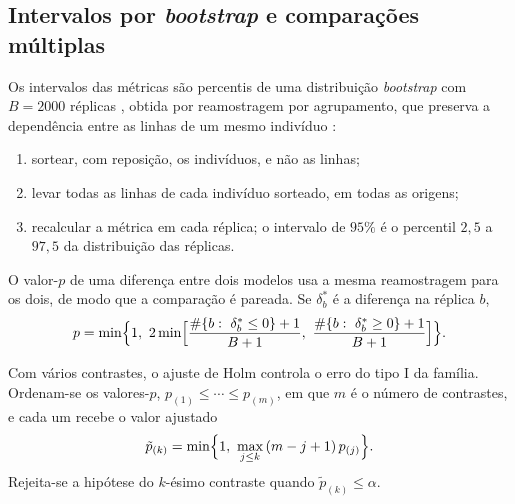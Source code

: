     \subsection{Intervalos por \textit{bootstrap} e comparações múltiplas}
    \label{subsec:incerteza_metricas}

Os intervalos das métricas são percentis de uma distribuição \textit{bootstrap} com $B = 2000$ réplicas \citep{davison1997}, obtida por reamostragem por agrupamento, que preserva a dependência entre as linhas de um mesmo indivíduo \citep{field2007,davison1997,harrell2001}:
\begin{enumerate}
    \item sortear, com reposição, os indivíduos, e não as linhas;
    \item levar todas as linhas de cada indivíduo sorteado, em todas as origens;
    \item recalcular a métrica em cada réplica; o intervalo de $95\%$ é o percentil $2{,}5$ a $97{,}5$ da distribuição das réplicas.
\end{enumerate}
O valor-$p$ de uma diferença entre dois modelos usa a mesma reamostragem para os dois, de modo que a comparação é pareada. Se $\delta_b^{*}$ é a diferença na réplica $b$,
\begin{equation}
    p = \min\Bigl\{1,\ 2\min\Bigl[\frac{\#\{b:\ \delta_b^{*} \leq 0\}+1}{B+1},\ \frac{\#\{b:\ \delta_b^{*} \geq 0\}+1}{B+1}\Bigr]\Bigr\}.
    \label{eq:pboot}
\end{equation}

Com vários contrastes, o ajuste de Holm \citep{holm1979} controla o erro do tipo I da família. Ordenam-se os valores-$p$, $p_{(1)} \leq \cdots \leq p_{(m)}$, em que $m$ é o número de contrastes, e cada um recebe o valor ajustado
\begin{equation}
    \tilde{p}_{(k)} = \min\Bigl\{1,\ \max_{j \leq k}\,(m-j+1)\,p_{(j)}\Bigr\}.
    \label{eq:holm}
\end{equation}
Rejeita-se a hipótese do $k$-ésimo contraste quando $\tilde{p}_{(k)} \leq \alpha$.
